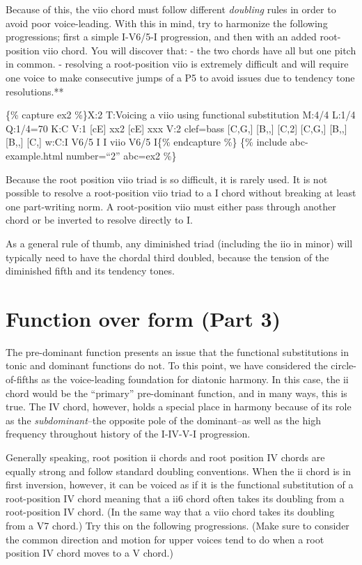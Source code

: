 \documentclass{book}
\begin{document}
Because of this, the viio chord must follow different \emph{doubling} rules in
order to avoid poor voice-leading. With this in mind, try to harmonize the
following progressions; first a simple I-V6/5-I progression, and then with an
added root-position viio chord. You will discover that: - the two chords have
all but one pitch in common. - resolving a root-position viio is extremely
difficult and will require one voice to make consecutive jumps of a P5 to
avoid issues due to tendency tone resolutions.**

\{\% capture ex2 \%\}X:2 T:Voicing a viio using functional substitution M:4/4
L:1/4 Q:1/4=70 K:C V:1 {[}cE{]} xx2\textbar\textbar{} {[}cE{]} xxx\textbar{]}
V:2 clef=bass {[}C,G,{]} {[}B,,{]} {[}C,2{]}\textbar\textbar{} {[}C,G,{]}
{[}B,,{]} {[}B,,{]} {[}C,{]}\textbar{]} w:C:I V6/5 I I viio V6/5 I\{\%
endcapture \%\} \{\% include abc-example.html number=``2'' abc=ex2 \%\}

Because the root position viio triad is so difficult, it is rarely used. It is
not possible to resolve a root-position viio triad to a I chord without
breaking at least one part-writing norm. A root-position viio must either pass
through another chord or be inverted to resolve directly to I.

As a general rule of thumb, any diminished triad (including the iio in minor)
will typically need to have the chordal third doubled, because the tension of
the diminished fifth and its tendency tones.

\hypertarget{function-over-form-part-3}{%
\section{Function over form (Part 3)}\label{function-over-form-part-3}}

The pre-dominant function presents an issue that the functional substitutions
in tonic and dominant functions do not. To this point, we have considered the
circle-of-fifths as the voice-leading foundation for diatonic harmony. In this
case, the ii chord would be the ``primary'' pre-dominant function, and in many
ways, this is true. The IV chord, however, holds a special place in harmony
because of its role as the \emph{subdominant}--the opposite pole of the
dominant--as well as the high frequency throughout history of the I-IV-V-I
progression.

Generally speaking, root position ii chords and root position IV chords are
equally strong and follow standard doubling conventions. When the ii chord is
in first inversion, however, it can be voiced as if it is the functional
substitution of a root-position IV chord meaning that a ii6 chord often takes
its doubling from a root-position IV chord. (In the same way that a viio chord
takes its doubling from a V7 chord.) Try this on the following progressions.
(Make sure to consider the common direction and motion for upper voices tend
to do when a root position IV chord moves to a V chord.)
\end{document}
